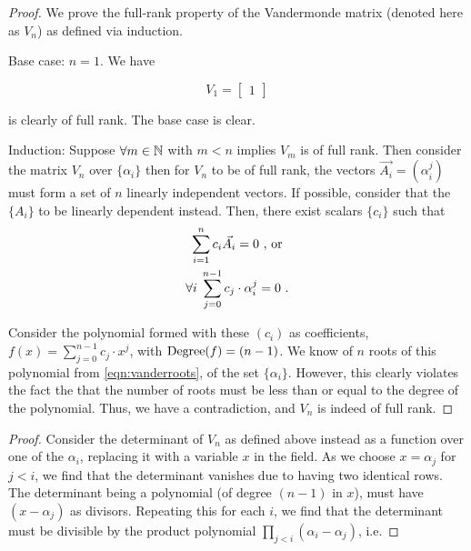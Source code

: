 \question

\begin{alphaparts}
    
    \questionpart
    \begin{proof}
        
        We prove the full-rank property of the Vandermonde matrix (denoted here as
        \(V_n\)) as defined via induction.
        
        Base case: \(n = 1\). We have
    
        \begin{equation}
            V_1 = \begin{bmatrix}
                1
            \end{bmatrix}
        \end{equation}
    
        is clearly of full rank. The base case is clear.
    
        Induction: Suppose \(\forall m \in \mathbb{N}\) with \(m < n\) implies
        \(V_m\) is of full rank. Then consider the matrix \(V_n\) over
        \(\{\alpha_i\}\) then for \(V_n\) to be of full rank, the vectors
        \(\vec{A_{i}} = (\alpha_i^j)\) must form a set of \(n\) linearly
        independent vectors. If possible, consider that the \(\{A_i\}\) to be
        linearly dependent instead. Then, there exist scalars \(\{c_i\}\) such
        that
        \begin{gather}
            \sum_{i = 1}^{n} c_i\vec{A_{i}} = 0 \textnormal{ , or} \\
            \forall i\; \sum_{j = 0}^{n-1} c_j \cdot \alpha_i^j = 0~.
            \label{eqn:vanderroots}
        \end{gather}
    
        Consider the polynomial formed with these \((c_i)\) as coefficients, \(f(x)
        = \sum_{j = 0}^{n-1} c_j \cdot x^j\), with \(\textnormal{Degree}(f) = (n-1)\). We know
        of \(n\) roots of this polynomial from \autoref{eqn:vanderroots}, of the set
        \(\{\alpha_i\}\). However, this clearly violates the fact the that the
        number of roots must be less than or equal to the degree of the polynomial.
        Thus, we have a contradiction, and \(V_n\) is indeed of full rank. 
    \end{proof}

    \questionpart
    \begin{proof}
        
        Consider the determinant of \(V_n\) as defined above instead as a
        function over one of the \(\alpha_i\), replacing it with a variable
        \(x\) in the field. As we choose \(x = \alpha_j\) for \(j < i\), we find
        that the determinant vanishes due to having two identical rows. The
        determinant being a polynomial (of degree $(n-1)$ in $x$), must have
        \((x - \alpha_j)\) as divisors. Repeating this for each \(i\), we find
        that the determinant must be divisible by the product polynomial
        \(\prod_{j < i} (\alpha_i - \alpha_j)\), i.e.
    

\end{proof}
\end{alphaparts}
